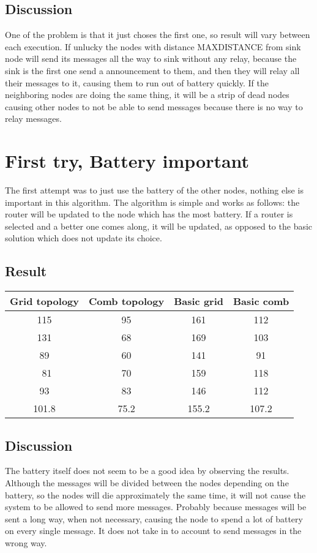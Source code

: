 \documentclass{article}
\begin{document}
  \subsection{Discussion}
    One of the problem is that it just choses the first one,
    so result will vary between each execution.
    If unlucky the nodes with distance MAXDISTANCE from
    sink node will send its messages all the way to sink
    without any relay, because the sink is the first one
    send a announcement to them, and then they will relay
    all their messages to it, causing them to run out of 
    battery quickly. If the neighboring nodes
    are doing the same thing, it will be a strip of dead
    nodes causing other nodes to not be able to send messages
    because there is no way to relay messages. 

\section{First try, Battery important}
  The first attempt was to just use the battery of the other nodes, 
  nothing else is important in this algorithm. The algorithm is simple
  and works as follows: the router will be updated to the node which 
  has the most battery. If a router is selected and a better one
  comes along, it will be updated, as opposed to the basic solution
  which does not update its choice.
  
  \subsection{Result}
    \begin{tabular}{c|c||c|c}
      Grid topology & Comb topology & Basic grid & Basic comb\\
      \hline
      \hline
      115 & 95 & 161 & 112\\
      131 & 68 & 169 & 103\\
      89  & 60 & 141 & 91\\\
      81  & 70 & 159 & 118\\
      93  & 83 & 146 & 112\\
      \hline
      101.8&75.2&155.2&107.2\\

      
    \end{tabular}
  \subsection{Discussion}
    The battery itself does not seem to be a good idea by observing the results. 
    Although the messages will be divided between the nodes depending on the battery,
    so the nodes will die approximately the same time, it will not cause the 
    system to be allowed to send more messages. Probably because messages will be sent 
    a long way, when not necessary, causing the node to spend a lot of battery on 
    every single message.
    It does not take in to account to send messages in the wrong way.
\end{document}
